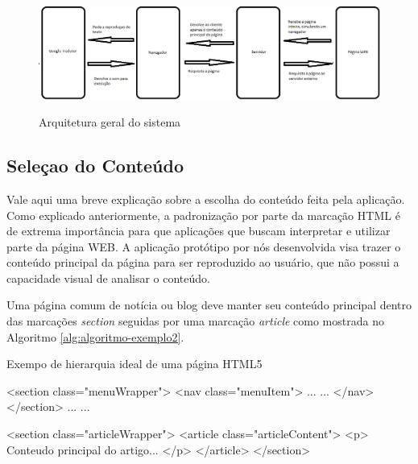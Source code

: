 \documentclass[
	12pt,				%
	oneside,			%
	a4paper,			%
	english,			%
	brazil				%
	]{abntex2ppgsi}
\begin{document}
\begin{figure}[htbp]
	\centering
	\caption{Arquitetura geral do sistema}
	\includegraphics[scale=0.5]{arquitetura_sistema.png}
	\label{fig:figura-sistema}

\end{figure}


\subsection{Seleçao do Conteúdo} \label{sec:selecao-conteudo}

Vale aqui uma breve explicação sobre a escolha do conteúdo feita pela aplicação. Como explicado anteriormente, a padronização por parte da marcação HTML é de extrema importância para que aplicações que buscam interpretar e utilizar parte da página WEB. A aplicação protótipo por nós desenvolvida visa trazer o conteúdo principal da página para ser reproduzido ao usuário, que não possui a capacidade visual de analisar o conteúdo.

Uma página comum de notícia ou blog deve manter seu conteúdo principal dentro das marcações \textit{section} seguidas por uma marcação \textit{article} como mostrada no Algoritmo \ref{alg:algoritmo-exemplo2}. 

\begin{algorithm}[htbp]
	\caption{Exempo de hierarquia ideal de uma página HTML5}
	\label{alg:algoritmo-exemplo2}
	\begin{algorithmic}
	\State \textless section class="menuWrapper"\textgreater
		\State \textless nav class="menuItem"\textgreater
		\State ... 
		\State ...
	\State	\textless/nav\textgreater
	\State \textless/section\textgreater
	\State ...
	\State ...
	
	\State \textless section class="articleWrapper"\textgreater
	\State 		\textless article class="articleContent"\textgreater
	\State 			\textless p\textgreater
	\State 				Conteudo principal do artigo...
		\State		\textless/p\textgreater
	\State		\textless/article\textgreater
	\State \textless/section\textgreater

	\end{algorithmic}
\end{algorithm}
\end{document}
